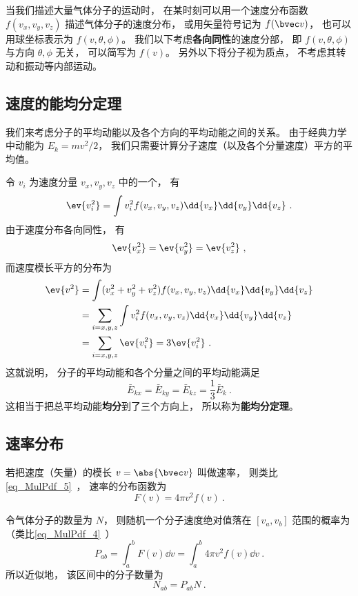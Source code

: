 
\begin{issues}
\issueTODO
\end{issues}

当我们描述大量气体分子的运动时， 在某时刻可以用一个速度分布函数 $f(v_x, v_y, v_z)$ 描述气体分子的速度分布， 或用矢量符号记为 $f(\bvec v)$， 也可以用球坐标表示为 $f(v, \theta, \phi)$。 我们以下考虑\textbf{各向同性}的速度分部， 即 $f(v, \theta, \phi)$ 与方向 $\theta, \phi$ 无关， 可以简写为 $f(v)$。 另外以下将分子视为质点， 不考虑其转动和振动等内部运动。

\subsection{速度的能均分定理}
我们来考虑分子的平均动能以及各个方向的平均动能之间的关系。 由于经典力学中动能为 $E_k = mv^2/2$， 我们只需要计算分子速度（以及各个分量速度）平方的平均值。

令 $v_i$ 为速度分量 $v_x, v_y, v_z$ 中的一个， 有
\begin{equation}
\ev{v_i^2} = \int v_i^2 f(v_x, v_y, v_z) \dd{v_x}\dd{v_y}\dd{v_z}~.
\end{equation}
由于速度分布各向同性， 有
\begin{equation}
\ev{v_x^2} = \ev{v_y^2} = \ev{v_z^2}~,
\end{equation}
而速度模长平方的分布为
\begin{equation}
\begin{aligned}
\ev{v^2} &= \int (v_x^2 + v_y^2 + v_z^2) f(v_x, v_y, v_z) \dd{v_x}\dd{v_y}\dd{v_z}\\
&= \sum_{i = x,y,z} \int v_i^2 f(v_x, v_y, v_z) \dd{v_x}\dd{v_y}\dd{v_z}\\
&= \sum_{i = x,y,z} \ev{v_i^2} = 3 \ev{v_i^2}~.
\end{aligned}
\end{equation}
这就说明， 分子的平均动能和各个分量之间的平均动能满足
\begin{equation}\label{eq_VelPdf_1}
\bar E_{kx} = \bar E_{ky} = \bar E_{kz} = \frac{1}{3} \bar E_k~.
\end{equation}
这相当于把总平均动能\textbf{均分}到了三个方向上， 所以称为\textbf{能均分定理}。

\subsection{速率分布}
若把速度（矢量）的模长 $v = \abs{\bvec v}$ 叫做速率， 则类比\autoref{eq_MulPdf_5}~， 速率的分布函数为
\begin{equation}
F(v) = 4\pi v^2 f(v)~.
\end{equation}

令气体分子的数量为 $N$， 则随机一个分子速度绝对值落在 $[v_a, v_b]$ 范围的概率为（类比\autoref{eq_MulPdf_4}~）
\begin{equation}
P_{ab} = \int_a^b F(v) \dd{v} = \int_a^b 4\pi v^2 f(v) \dd{v}~.
\end{equation}
所以近似地， 该区间中的分子数量为
\begin{equation}
N_{ab} = P_{ab} N~.
\end{equation}

